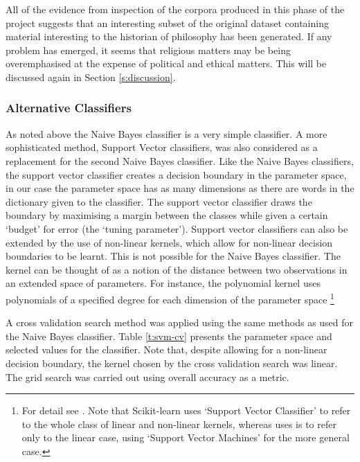 \documentclass{article}
\begin{document}
All of the evidence from inspection of the corpora produced in this phase of the project suggests that an interesting subset of the original dataset containing material interesting to the historian of philosophy has been generated. If any problem has emerged, it seems that religious matters may be being overemphasised at the expense of political and ethical matters. This will be discussed again in Section \ref{s:discussion}.

\subsubsection{Alternative Classifiers} %

As noted above the Naive Bayes classifier is a very simple classifier. A more sophisticated method, Support Vector classifiers, was also considered as a replacement for the second Naive Bayes classifier. Like the Naive Bayes classifiers, the support vector classifier creates a decision boundary in the parameter space, in our case the parameter space has as many dimensions as there are words in the dictionary given to the classifier. The support vector classifier draws the boundary by maximising a margin between the classes while given a certain `budget' for error (the `tuning parameter'). Support vector classifiers can also be extended by the use of non-linear kernels, which allow for non-linear decision boundaries to be learnt. This is not possible for the Naive Bayes classifier. The kernel can be thought of as a notion of the distance between two observations in an extended space of parameters. For instance, the polynomial kernel uses polynomials of a specified degree for each dimension of the parameter space \footnote{For detail see \cite[\S\S 9.2-9.3]{islr}. Note that Scikit-learn uses `Support Vector Classifier' to refer to the whole class of linear and non-linear kernels, whereas \cite{islr} uses is to refer only to the linear case, using `Support Vector Machines' for the more general case.}

A cross validation search method was applied using the same methods as used for the Naive Bayes classifier. Table \ref{t:svm-cv} presents the parameter space and selected values for the classifier. Note that, despite allowing for a non-linear decision boundary, the kernel chosen by the cross validation search was linear. The grid search was carried out using overall accuracy as a metric.
\end{document}
